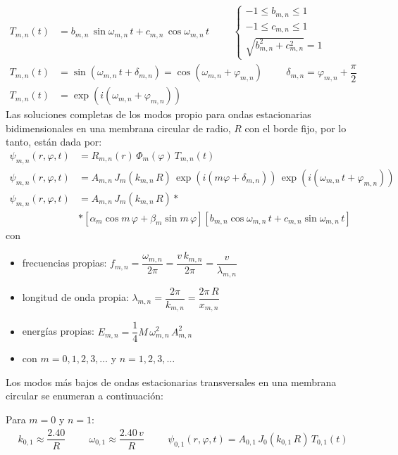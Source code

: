 \begin{align*}
T_{m, n} (t) &= b_{m, n} \, \sin \omega_{m, n} \, t + c_{m , n} \, \cos \omega_{m, n} \, t \hspace{1cm} \begin{cases}
-1 \leq b_{m, n} \leq 1 \\
-1 \leq c_{m, n} \leq 1 \\
\sqrt{b_{m, n}^{2} + c_{m, n}^{2}} = 1
\end{cases} \\[1em]
T_{m, n} (t) &= \sin (\omega_{m, n} \, t + \delta_{m, n}) = \cos (\omega_{m, n} + \varphi_{m, n} ) \hspace{1cm} \delta_{m, n} = \varphi_{m, n} + \dfrac{\pi}{2} \\[1em]
T_{m, n} (t) &= \exp(i (\omega_{m, n} + \varphi_{m, n}))
\end{align*}
Las soluciones completas de los modos propio para ondas estacionarias bidimensionales en una membrana circular de radio, $R$ con el borde fijo, por lo tanto, están dada por:
\begin{align*}
\psi_{m,n} (r, \varphi, t) &= R_{m, n} (r) \, \Phi_{m}(\varphi) \, T_{m, n} (t) \\[1em]
\psi_{m,n} (r, \varphi, t) &= A_{m, n} \, J_{m} (k_{m,n} \, R) \, \exp(i(m \varphi + \delta_{m, n} )) \, \exp(i(\omega_{m,n} \, t + \varphi_{m, n})) \\[1em]
\psi_{m,n} (r, \varphi, t) &= A_{m, n} \, J_{m} (k_{m,n} \, R) *\\
&* [\alpha_{m} \cos m \, \varphi + \beta_{m} \sin m \, \varphi ][b_{m, n}\cos \omega_{m, n} \, t + c_{m, n} \sin \omega_{m, n} \, t]
\end{align*}
con
\begin{itemize}
\item frecuencias propias: $f_{m, n} = \dfrac{\omega_{m, n}}{2 \pi} = \dfrac{v \, k_{m, n}}{2 \pi} = \dfrac{v}{\lambda_{m, n}}$
\item longitud de onda propia: $\lambda_{m, n} = \dfrac{2 \pi}{k_{m, n}} = \dfrac{2 \pi \, R}{x_{m, n}}$
\item energías propias: $E_{m, n} = \dfrac{1}{4} M \, \omega_{m, n}^{2} \, A_{m, n}^{2}$
\item con $m= 0, 1, 2, 3, \ldots$ y $n = 1, 2, 3, \ldots$
\end{itemize}
Los modos más bajos de ondas estacionarias transversales en una membrana circular se enumeran a continuación:
\par
Para $m = 0$ y $n = 1$:
\begin{align*}
k_{0,1} \approx \dfrac{2.40}{R} \hspace{1cm} \omega_{0,1} \approx \dfrac{2.40 \, v}{R} \hspace{1cm}
\psi_{0,1} (r,\varphi,t) = A_{0,1} \, J_{0}(k_{0,1} \, R) \, T_{0,1} (t)
\end{align*}
